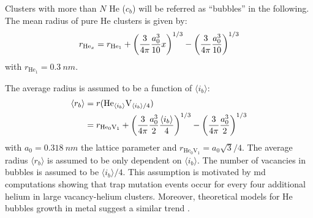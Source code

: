 Clusters with more than $N$ \gls{He} ($c_b$) will be referred as ``bubbles'' in the following.
The mean radius of pure \gls{He} clusters  is given by:
\begin{equation}
    r_{\mathrm{He}_x} = r_{\mathrm{He}_1} + \left(\frac{3}{4\pi} \frac{a_0^3}{10} x \right)^{1/3} - \left( \frac{3}{4\pi} \frac{a_0^3}{10} \right)^{1/3}
    \labeq{radius pure He}
\end{equation}
with $r_{\mathrm{He}_1} = \SI{0.3}{nm}$.

The average radius is assumed to be a function of $\langle i_b \rangle$:
\begin{equation}
    \begin{split}
        \langle r_b \rangle &= r(\mathrm{He}_{\langle i_b \rangle}\mathrm{V}_{\langle i_b \rangle/4}) \\
        &= r_{\mathrm{He}_0 \mathrm{V}_1} + \left(\frac{3}{4 \pi} \frac{a_0^3}{2} \frac{\langle i_b \rangle}{4} \right)^{1/3} - \left(\frac{3}{4 \pi} \frac{a_0^3}{2} \right)^{1/3}
    \end{split}
    \labeq{radius average}
\end{equation}
with $a_0 = \SI{0.318}{nm}$ the lattice parameter and $r_{\mathrm{He}_0 \mathrm{V}_1} =  a_0 \sqrt{3}/4$.
The average radius $\langle r_b \rangle$ is assumed to be only dependent on $\langle i_b \rangle$.
The number of vacancies in bubbles is assumed to be $\langle i_b \rangle/4$.
This assumption is motivated by \gls{md} computations showing that \gls{trap mutation} events occur for every four additional helium in large \gls{vacancy}-helium clusters.
Moreover, theoretical models for He bubbles growth in metal suggest a similar trend .


